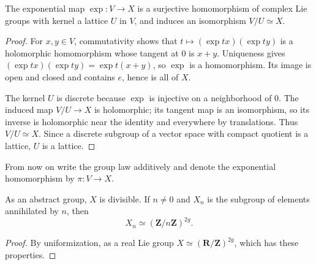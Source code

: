 \begin{theorem}[Uniformization]
\label{mumford-frag-uniformization}
The exponential map $\exp:V\to X$ is a surjective homomorphism of complex
Lie groups with kernel a lattice $U$ in $V$, and induces an isomorphism
$V/U\simeq X$.
\end{theorem}
\begin{proof}
For $x,y\in V$, commutativity shows that
$t\mapsto(\exp tx)(\exp ty)$ is a holomorphic homomorphism whose tangent at
$0$ is $x+y$.  Uniqueness gives
$(\exp tx)(\exp ty)=\exp t(x+y)$, so $\exp$ is a homomorphism.  Its image is
open and closed and contains $e$, hence is all of $X$.

The kernel $U$ is discrete because $\exp$ is injective on a neighborhood of
$0$.  The induced map $V/U\to X$ is holomorphic; its tangent map is an
isomorphism, so its inverse is holomorphic near the identity and everywhere
by translations.  Thus $V/U\simeq X$.  Since a discrete subgroup of a vector
space with compact quotient is a lattice, $U$ is a lattice.
\end{proof}

From now on write the group law additively and denote the exponential
homomorphism by $\pi:V\to X$.

\begin{proposition}
\label{mumford-frag-torsion}
As an abstract group, $X$ is divisible.  If $n\neq0$ and $X_n$ is the subgroup
of elements annihilated by $n$, then
\[
 X_n\simeq(\mathbf Z/n\mathbf Z)^{2g}.
\]
\end{proposition}
\begin{proof}
By uniformization, as a real Lie group $X\simeq(\mathbf R/\mathbf Z)^{2g}$,
which has these properties.
\end{proof}

